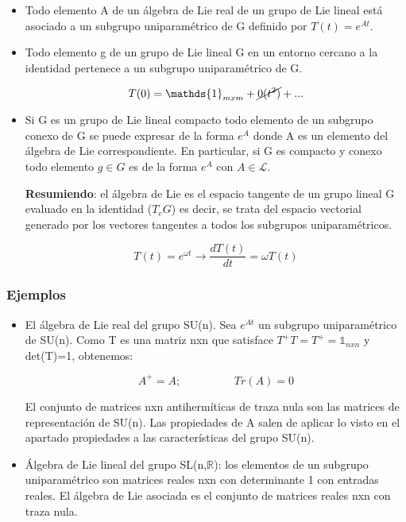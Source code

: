 \documentclass{article}
\begin{document}
     \begin{itemize}
         \item Todo elemento A de un álgebra de Lie real de un grupo de Lie lineal está asociado a un subgrupo uniparamétrico de G definido por $T(t)=e^{At}$.

         \item Todo elemento g de un grupo de Lie lineal G en un entorno cercano a la identidad pertenece a un subgrupo uniparamétrico de G.

         $$T(0)=\mathds{1}_{mxm}+\cancel{0(t^2)}+...$$

         \item Si G es un grupo de Lie lineal compacto todo elemento de un subgrupo conexo de G se puede expresar de la forma $e^A$ donde A es un elemento del álgebra de Lie correspondiente. En particular, si G es compacto y conexo todo elemento $g\in G$ es de la forma $e^A$ con $A\in  \mathcal{L}$.

         \textbf{Resumiendo}: el álgebra de Lie es el espacio tangente de un grupo lineal G evaluado en la identidad ($T_eG$) es decir, se trata del espacio vectorial generado por los vectores tangentes a todos los subgrupos uniparamétricos.

         $$T(t)=e^{\omega t} \longrightarrow \frac{dT(t)}{dt}=\omega T(t)$$

         \end{itemize}

         \subsubsection{Ejemplos}

         \begin{itemize}
             \item El álgebra de Lie real del grupo SU(n). Sea $e^{At}$ un subgrupo uniparamétrico de SU(n). Como T es una matriz nxn que satisface $T^+T=T^+=\mathds{1}_{nxn}$ y det(T)=1, obtenemos:

             $$A^+=A; \hspace{2cm} Tr(A)=0$$

             El conjunto de matrices nxn antihermíticas de traza nula son las matrices de representación de SU(n). Las propiedades de A salen de aplicar lo visto en el apartado propiedades a las características del grupo SU(n).

             \item Álgebra de Lie lineal del grupo SL(n,$\mathds{R}$): los elementos de un subgrupo uniparamétrico son matrices reales nxn con determinante 1 con entradas reales. El álgebra de Lie asociada es el conjunto de matrices reales nxn con traza nula.
         \end{itemize}
\end{document}

